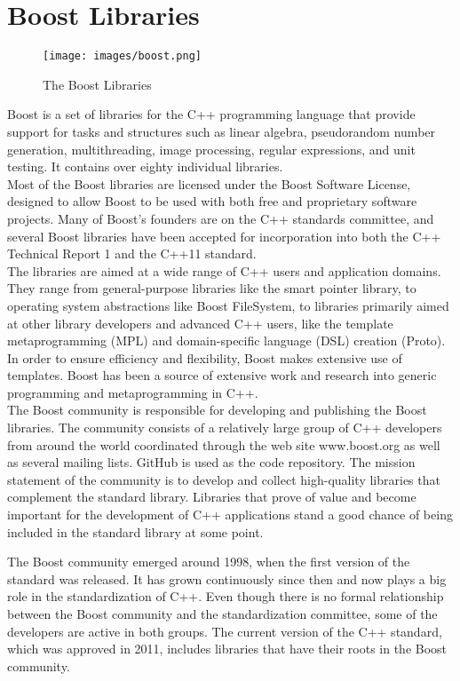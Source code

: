\section{Boost Libraries}
\begin{figure}[H]
    \centering \texttt{[image: images/boost.png]}
    \caption{The Boost Libraries}
    \label{fig:boost}
\end{figure}
Boost is a set of libraries for the C++ programming language that provide support for tasks and structures such as linear algebra, pseudorandom number generation, multithreading, image processing, regular expressions, and unit testing. It contains over eighty individual libraries.\\
Most of the Boost libraries are licensed under the Boost Software License, designed to allow Boost to be used with both free and proprietary software projects. Many of Boost's founders are on the C++ standards committee, and several Boost libraries have been accepted for incorporation into both the C++ Technical Report 1 and the C++11 standard.\\
The libraries are aimed at a wide range of C++ users and application domains. They range from general-purpose libraries like the smart pointer library, to operating system abstractions like Boost FileSystem, to libraries primarily aimed at other library developers and advanced C++ users, like the template metaprogramming (MPL) and domain-specific language (DSL) creation (Proto).\\
In order to ensure efficiency and flexibility, Boost makes extensive use of templates. Boost has been a source of extensive work and research into generic programming and metaprogramming in C++.\\
The Boost community is responsible for developing and publishing the Boost libraries. The community consists of a relatively large group of C++ developers from around the world coordinated through the web site www.boost.org as well as several mailing lists. GitHub is used as the code repository. The mission statement of the community is to develop and collect high-quality libraries that complement the standard library. Libraries that prove of value and become important for the development of C++ applications stand a good chance of being included in the standard library at some point.

The Boost community emerged around 1998, when the first version of the standard was released. It has grown continuously since then and now plays a big role in the standardization of C++. Even though there is no formal relationship between the Boost community and the standardization committee, some of the developers are active in both groups. The current version of the C++ standard, which was approved in 2011, includes libraries that have their roots in the Boost community.

